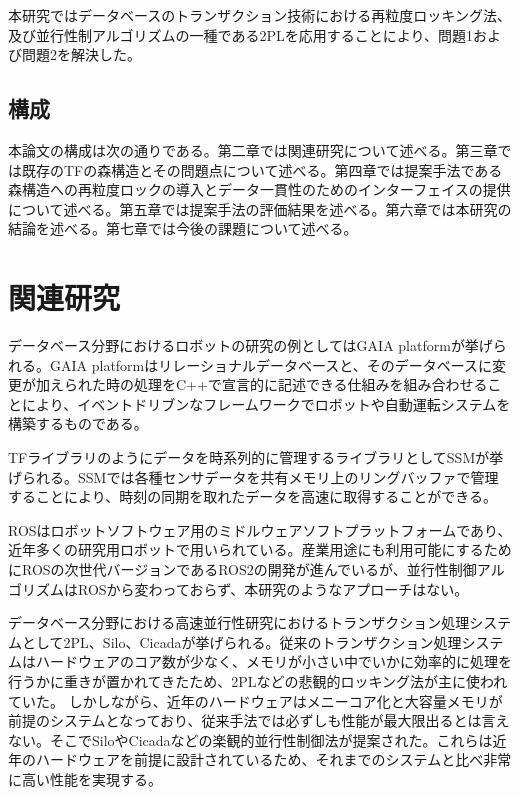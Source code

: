 \documentclass[a4paper]{jreport}	%
\begin{document}
本研究ではデータベースのトランザクション技術における再粒度ロッキング法、及び並行性制アルゴリズムの一種である2PLを応用することにより、問題1および問題2を解決した。

\section{構成}
本論文の構成は次の通りである。第二章では関連研究について述べる。第三章では既存のTFの森構造とその問題点について述べる。第四章では提案手法である森構造への再粒度ロックの導入とデータ一貫性のためのインターフェイスの提供について述べる。第五章では提案手法の評価結果を述べる。第六章では本研究の結論を述べる。第七章では今後の課題について述べる。

\chapter{関連研究}

データベース分野におけるロボットの研究の例としてはGAIA platform\cite{gaia}が挙げられる。GAIA platformはリレーショナルデータベースと、そのデータベースに変更が加えられた時の処理をC++で宣言的に記述できる仕組みを組み合わせることにより、イベントドリブンなフレームワークでロボットや自動運転システムを構築するものである。

TFライブラリのようにデータを時系列的に管理するライブラリとしてSSMが挙げられる。SSMでは各種センサデータを共有メモリ上のリングバッファで管理することにより、時刻の同期を取れたデータを高速に取得することができる。


ROSはロボットソフトウェア用のミドルウェアソフトプラットフォームであり、近年多くの研究用ロボットで用いられている。産業用途にも利用可能にするためにROSの次世代バージョンであるROS2\cite{ros2}の開発が進んでいるが、並行性制御アルゴリズムはROSから変わっておらず、本研究のようなアプローチはない。

データベース分野における高速並行性研究におけるトランザクション処理システムとして2PL、Silo、Cicadaが挙げられる。従来のトランザクション処理システムはハードウェアのコア数が少なく、メモリが小さい中でいかに効率的に処理を行うかに重きが置かれてきたため、2PLなどの悲観的ロッキング法が主に使われていた。
しかしながら、近年のハードウェアはメニーコア化と大容量メモリが前提のシステムとなっており、従来手法では必ずしも性能が最大限出るとは言えない。そこでSilo\cite{silo}やCicada\cite{Cicada}などの楽観的並行性制御法が提案された。これらは近年のハードウェアを前提に設計されているため、それまでのシステムと比べ非常に高い性能を実現する。
\end{document}

